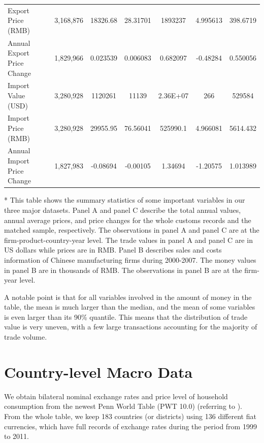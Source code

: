 \begin{table}[htbp]
{\begin{threeparttable}
\begin{tabular}{lcccccc}
		Export Price (RMB) & 3,168,876 & 18326.68 & 28.31701 & 1893237 & 4.995613 & 398.6719 \\
		Annual Export Price Change & 1,829,966 & 0.023539 & 0.006083 & 0.682097 & -0.48284 & 0.550056 \\
		Import Value (USD) & 3,280,928 & 1120261 & 11139 & 2.36E+07 & 266   & 529584 \\
		Import Price (RMB) & 3,280,928 & 29955.95 & 76.56041 & 525990.1 & 4.966081 & 5614.432 \\
		Annual Import Price Change  & 1,827,983 & -0.08694 & -0.00105 & 1.34694 & -1.20575 & 1.013989 \\
		\bottomrule
	\end{tabular}
	\begin{tablenotes}
		\footnotesize
		\item[*] This table shows the summary statistics of some important variables in our three major datasets. Panel A and panel C describe the total annual values, annual average prices, and price changes for the whole customs records and the matched sample, respectively. The observations in panel A and panel C are at the firm-product-country-year level. The trade values in panel A and panel C are in US dollars while prices are in RMB. Panel B describes sales and costs information of Chinese manufacturing firms during 2000-2007. The money values in panel B are in thousands of RMB. The observations in panel B are at the firm-year level.
	\end{tablenotes}
	\end{threeparttable}
	}
\end{table}

A notable point is that for all variables involved in the amount of money in the table, the mean is much larger than the median, and the mean of some variables is even larger than its 90\% quantile. This means that the distribution of trade value is very uneven, with a few large transactions accounting for the majority of trade volume.

\section{Country-level Macro Data}

We obtain bilateral nominal exchange rates and price level of household consumption from the newest Penn World Table (PWT 10.0) (referring to \cite{feenstra2015}). From the whole table, we keep 183 countries (or districts) using 136 different fiat currencies, which have full records of exchange rates during the period from 1999 to 2011. 

